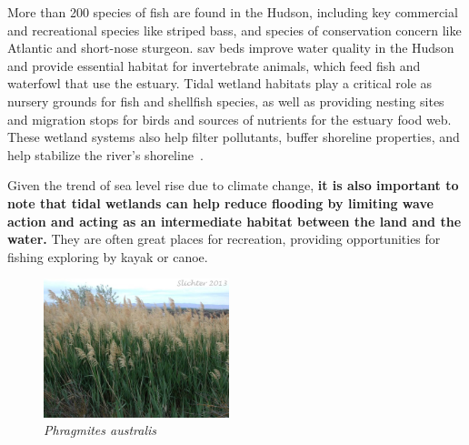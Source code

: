 \begin{displayquote}
More than 200 species of fish are found in the Hudson, including key commercial
    and recreational species like striped bass, and species of conservation
    concern like Atlantic and short-nose sturgeon. \gls{sav} beds improve water
    quality in the Hudson and provide essential habitat for invertebrate
    animals, which feed fish and waterfowl that use the estuary. Tidal wetland
    habitats play a critical role as nursery grounds for fish and shellfish
    species, as well as providing nesting sites and migration stops for birds
    and sources of nutrients for the estuary food web. These wetland systems
    also help filter pollutants, buffer shoreline properties, and help
    stabilize the river’s shoreline~\cite{haeckel2014}.
\end{displayquote}

Given the trend of sea level rise due to climate change, \textbf{it is also
important to note that tidal wetlands can help reduce flooding by limiting wave
action and acting as an intermediate habitat between the land and the water.}
They are often great places for recreation, providing opportunities for fishing
exploring by kayak or canoe. 
\begin{figure}
    \includegraphics[width=0.48\textwidth]{images/Common_reed.jpg}
  \caption{\textit{Phragmites australis}}
\end{figure}

